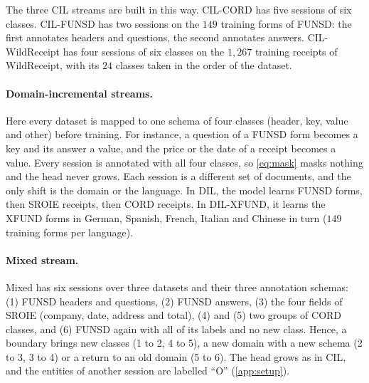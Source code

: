 \documentclass[10pt,twocolumn,letterpaper]{article}
\begin{document}
The three CIL streams are built in this way. CIL-CORD has five sessions of six classes. CIL-FUNSD has two sessions on the $149$ training forms of FUNSD: the first annotates headers and questions, the second annotates answers. CIL-WildReceipt has four sessions of six classes on the $1{,}267$ training receipts of WildReceipt, with its $24$ classes taken in the order of the dataset.

\paragraph{Domain-incremental streams.} Here every dataset is mapped to one schema of four classes (header, key, value and other) before training. For instance, a question of a FUNSD form becomes a key and its answer a value, and the price or the date of a receipt becomes a value. Every session is annotated with all four classes, so \cref{eq:mask} masks nothing and the head never grows. Each session is a different set of documents, and the only shift is the domain or the language. In DIL, the model learns FUNSD forms, then SROIE receipts, then CORD receipts. In DIL-XFUND, it learns the XFUND forms in German, Spanish, French, Italian and Chinese in turn ($149$ training forms per language).

\paragraph{Mixed stream.} Mixed has six sessions over three datasets and their three annotation schemas: (1) FUNSD headers and questions, (2) FUNSD answers, (3) the four fields of SROIE (company, date, address and total), (4) and (5) two groups of CORD classes, and (6) FUNSD again with all of its labels and no new class. Hence, a boundary brings new classes (1 to 2, 4 to 5), a new domain with a new schema (2 to 3, 3 to 4) or a return to an old domain (5 to 6). The head grows as in CIL, and the entities of another session are labelled ``O'' (\cref{app:setup}).

\begin{table}[t]
\centering\scriptsize
\setlength{\tabcolsep}{2.5pt}
\caption{\textbf{Benchmark settings}: six streams over five document datasets (sessions: \cref{app:setup}). Train/test documents: FUNSD 149/50, SROIE 626/347, CORD 800/100. AA: mean F1 of the final model over the sessions; full-label F1: on the unmasked test set of the stream's dataset (\cref{sec:setup}).}
\label{tab:bench}

\end{table}
\end{document}
